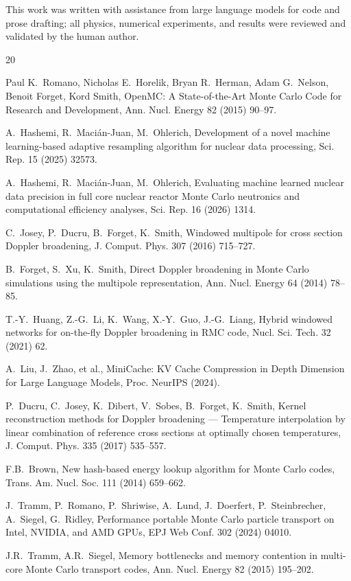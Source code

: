 \documentclass[11pt,a4paper]{article}
\begin{document}
This work was written with assistance from large language
models for code and prose drafting; all physics, numerical
experiments, and results were reviewed and validated by the
human author.

\begin{thebibliography}{20}

Paul K.~Romano, Nicholas E.~Horelik, Bryan R.~Herman,
Adam G.~Nelson, Benoit Forget, Kord Smith,
OpenMC: A State-of-the-Art Monte Carlo Code for Research and Development,
Ann. Nucl. Energy 82 (2015) 90--97.

A.~Hashemi, R.~Maci\'{a}n-Juan, M.~Ohlerich,
Development of a novel machine learning-based adaptive resampling
algorithm for nuclear data processing,
Sci. Rep. 15 (2025) 32573.

A.~Hashemi, R.~Maci\'{a}n-Juan, M.~Ohlerich,
Evaluating machine learned nuclear data precision in full core nuclear
reactor Monte Carlo neutronics and computational efficiency analyses,
Sci. Rep. 16 (2026) 1314.

C.~Josey, P.~Ducru, B.~Forget, K.~Smith,
Windowed multipole for cross section Doppler broadening,
J. Comput. Phys. 307 (2016) 715--727.

B.~Forget, S.~Xu, K.~Smith,
Direct Doppler broadening in Monte Carlo simulations using the
multipole representation,
Ann. Nucl. Energy 64 (2014) 78--85.

T.-Y.~Huang, Z.-G.~Li, K.~Wang, X.-Y.~Guo, J.-G.~Liang,
Hybrid windowed networks for on-the-fly Doppler broadening in RMC code,
Nucl. Sci. Tech. 32 (2021) 62.

A.~Liu, J.~Zhao, et al.,
MiniCache: KV Cache Compression in Depth Dimension for Large
Language Models,
Proc. NeurIPS (2024).

P.~Ducru, C.~Josey, K.~Dibert, V.~Sobes, B.~Forget, K.~Smith,
Kernel reconstruction methods for Doppler broadening --- Temperature
interpolation by linear combination of reference cross sections at
optimally chosen temperatures,
J. Comput. Phys. 335 (2017) 535--557.

F.B.~Brown,
New hash-based energy lookup algorithm for Monte Carlo codes,
Trans. Am. Nucl. Soc. 111 (2014) 659--662.

J.~Tramm, P.~Romano, P.~Shriwise, A.~Lund, J.~Doerfert,
P.~Steinbrecher, A.~Siegel, G.~Ridley,
Performance portable Monte Carlo particle transport on Intel, NVIDIA,
and AMD GPUs,
EPJ Web Conf. 302 (2024) 04010.

J.R.~Tramm, A.R.~Siegel,
Memory bottlenecks and memory contention in multi-core Monte Carlo
transport codes,
Ann. Nucl. Energy 82 (2015) 195--202.

\end{thebibliography}
\end{document}
